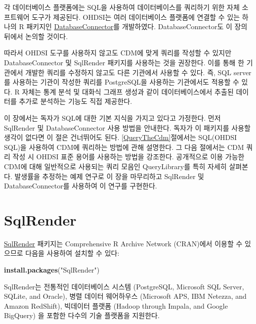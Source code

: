 \documentclass[10.5pt]{book}
\newenvironment{Shaded}{\begin{snugshade}}{\end{snugshade}}
\newcommand{\KeywordTok}[1]{\textcolor[rgb]{0.13,0.29,0.53}{\textbf{#1}}}
\newcommand{\StringTok}[1]{\textcolor[rgb]{0.31,0.60,0.02}{#1}}
\newcommand{\NormalTok}[1]{#1}
\theoremstyle{definition}
\theoremstyle{definition}
\theoremstyle{definition}
\theoremstyle{remark}
\begin{document}
각 데이터베이스 플랫폼에는 SQL을 사용하여 데이터베이스를 쿼리하기 위한
자체 소프트웨어 도구가 제공된다. OHDSI는 여러 데이터베이스 플랫폼에
연결할 수 있는 하나의 R 패키지인
\href{https://ohdsi.github.io/DatabaseConnector/}{DatabaseConnector}를
개발하였다. DatabaseConnector도 이 장의 뒤에서 논의할 것이다.

따라서 OHDSI 도구를 사용하지 않고도 CDM에 맞게 쿼리를 작성할 수 있지만
DatabaseConnector 및 SqlRender 패키지를 사용하는 것을 권장한다. 이를
통해 한 기관에서 개발한 쿼리를 수정하지 않고도 다른 기관에서 사용할 수
있다. 즉, SQL server를 사용하는 기관이 작성한 쿼리를 PostgreSQL을
사용하는 기관에서도 적용할 수 있다. R 자체는 통계 분석 및 대화식 그래프
생성과 같이 데이터베이스에서 추출된 데이터를 추가로 분석하는 기능도 직접
제공한다. 

이 장에서는 독자가 SQL에 대한 기본 지식을 가지고 있다고 가정한다. 먼저
SqlRender 및 DatabaseConnector 사용 방법을 안내한다. 독자가 이 패키지를
사용할 생각이 없다면 이 절은 건너뛰어도 된다. \ref{QueryTheCdm}절에서는
SQL(OHDSI SQL)을 사용하여 CDM에 쿼리하는 방법에 관해 설명한다. 그 다음
절에서는 CDM 쿼리 작성 시 OHDSI 표준 용어를 사용하는 방법을 강조한다.
공개적으로 이용 가능한 CDM에 대해 일반적으로 사용되는 쿼리 모음인
QueryLibrary를 특히 자세히 살펴본다. 발생률을 추정하는 예제 연구로 이
장을 마무리하고 SqlRender 및 DatabaseConnector를 사용하여 이 연구를
구현한다. 

\hypertarget{SqlRender}{\section{SqlRender}\label{SqlRender}}

\href{https://ohdsi.github.io/SqlRender/}{SqlRender} 패키지는
Comprehensive R Archive Network (CRAN)에서 이용할 수 있으므로 다음을
사용하여 설치할 수 있다:

\begin{Shaded}
\begin{Highlighting}[]
\KeywordTok{install.packages}\NormalTok{(}\StringTok{"SqlRender"}\NormalTok{)}
\end{Highlighting}
\end{Shaded}

SqlRender는 전통적인 데이터베이스 시스템 (PostgreSQL, Microsoft SQL
Server, SQLite, and Oracle), 병렬 데이터 웨어하우스 (Microsoft APS, IBM
Netezza, and Amazon RedShift), 빅데이터 플랫폼 (Hadoop through Impala,
and Google BigQuery) 을 포함한 다수의 기술 플랫폼을 지원한다.
\end{document}
